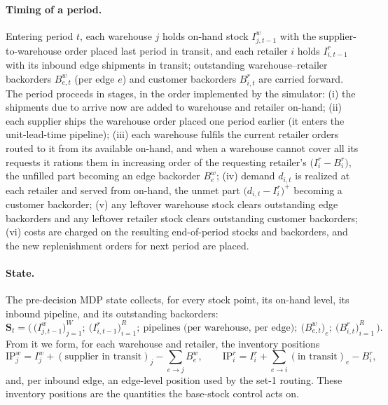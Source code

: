 \paragraph{Timing of a period.}
Entering period $t$, each warehouse $j$ holds on-hand stock $I^w_{j,t-1}$ with the
supplier-to-warehouse order placed last period in transit, and each retailer $i$ holds $I^r_{i,t-1}$
with its inbound edge shipments in transit; outstanding warehouse--retailer backorders $B^w_{e,t}$
(per edge $e$) and customer backorders $B^r_{i,t}$ are carried forward. The period proceeds in stages,
in the order implemented by the simulator: (i) the shipments due to arrive now are added to warehouse
and retailer on-hand; (ii) each supplier ships the warehouse order placed one period earlier (it
enters the unit-lead-time pipeline); (iii) each warehouse fulfils the current retailer orders routed
to it from its available on-hand, and when a warehouse cannot cover all its requests it rations them
in increasing order of the requesting retailer's $\big(I^r_{i}-B^r_{i}\big)$, the unfilled part
becoming an edge backorder $B^w_{e}$; (iv) demand $d_{i,t}$ is realized at each retailer and served
from on-hand, the unmet part $\big(d_{i,t}-I^r_{i}\big)^+$ becoming a customer backorder; (v) any
leftover warehouse stock clears outstanding edge backorders and any leftover retailer stock clears
outstanding customer backorders; (vi) costs are charged on the resulting end-of-period stocks and
backorders, and the new replenishment orders for next period are placed.

\paragraph{State.}
The pre-decision MDP state collects, for every stock point, its on-hand level, its inbound pipeline,
and its outstanding backorders:
\begin{equation*}
  \mathbf S_t = \Big(\, \big(I^w_{j,t-1}\big)_{j=1}^{W};\ \big(I^r_{i,t-1}\big)_{i=1}^{R};\
  \text{pipelines (per warehouse, per edge)};\ \big(B^w_{e,t}\big)_{e};\ \big(B^r_{i,t}\big)_{i=1}^{R} \,\Big).
\end{equation*}
From it we form, for each warehouse and retailer, the inventory positions
\begin{equation*}
  \mathrm{IP}^w_{j}=I^w_{j}+(\text{supplier in transit})_j-\textstyle\sum_{e\to j}B^w_{e},
  \qquad
  \mathrm{IP}^r_{i}=I^r_{i}+\textstyle\sum_{e\to i}(\text{in transit})_e-B^r_{i},
\end{equation*}
and, per inbound edge, an edge-level position used by the set-1 routing. These inventory positions are
the quantities the base-stock control acts on.

